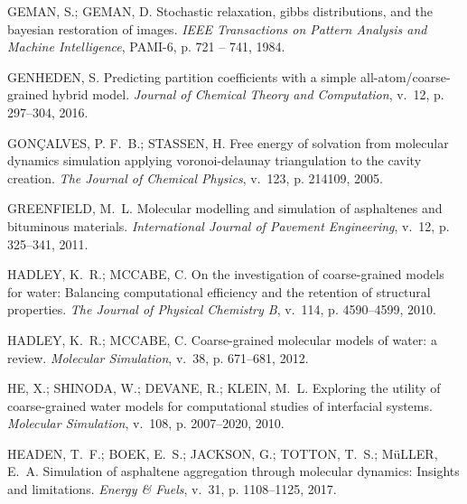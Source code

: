 \documentclass[
	12pt,				%
	openany,			%
	oneside,			%
	a4paper,			%
	english,			%
	brazil				%
	]{abntex2}
\begin{document}
\begin{thebibliography}{}
{GEMAN, S.; GEMAN, D. Stochastic relaxation, gibbs distributions, and the
  bayesian restoration of images.
\emph{IEEE Transactions on Pattern Analysis and Machine Intelligence}, PAMI-6,
  p. 721 -- 741, 1984.}

{GENHEDEN, S. Predicting partition coefficients with a simple
  all-atom/coarse-grained hybrid model.
\emph{Journal of Chemical Theory and Computation}, v.~12, p. 297--304, 2016.}

{GON{\c C}ALVES, P. F.~B.; STASSEN, H. Free energy of solvation from molecular
  dynamics simulation applying voronoi-delaunay triangulation to the cavity
  creation.
\emph{The Journal of Chemical Physics}, v.~123, p. 214109, 2005.}

{GREENFIELD, M.~L. Molecular modelling and simulation of asphaltenes and
  bituminous materials.
\emph{International Journal of Pavement Engineering}, v.~12, p. 325--341,
  2011.}

{HADLEY, K.~R.; MCCABE, C. On the investigation of coarse-grained models for
  water: Balancing computational efficiency and the retention of structural
  properties.
\emph{The Journal of Physical Chemistry B}, v.~114, p. 4590--4599, 2010.}

{HADLEY, K.~R.; MCCABE, C. Coarse-grained molecular models of water: a review.
\emph{Molecular Simulation}, v.~38, p. 671–681, 2012.}

{HE, X.; SHINODA, W.; DEVANE, R.; KLEIN, M.~L. Exploring the utility of
  coarse-grained water models for computational studies of interfacial systems.
\emph{Molecular Simulation}, v.~108, p. 2007--2020, 2010.}

{HEADEN, T.~F.; BOEK, E.~S.; JACKSON, G.; TOTTON, T.~S.; MüLLER, E.~A.
  Simulation of asphaltene aggregation through molecular dynamics: Insights and
  limitations.
\emph{Energy \& Fuels}, v.~31, p. 1108--1125, 2017.}


\end{thebibliography}
\end{document}
